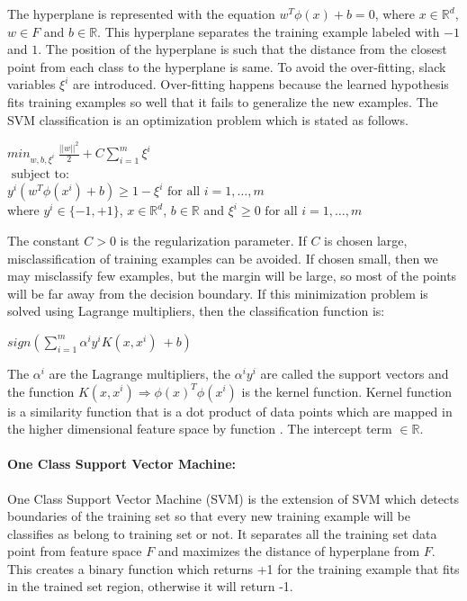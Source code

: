 \documentclass[12pt,oneside,a4paper]{article}
\begin{document}
The hyperplane is represented with the equation $w^{T} \phi(x) + b = 0$, where $x \in \mathbb{R}^d$, $w \in F$ and $b \in \mathbb{R}$. This hyperplane separates the training example labeled with $-1$ and $1$. The position of the hyperplane is such that the distance from the closest point from each class to the hyperplane is same. To avoid the over-fitting, slack variables $\xi^{i}$ are introduced. Over-fitting happens because the learned hypothesis fits training examples so well that it fails to generalize the new examples. The SVM classification is an optimization problem which is stated as follows.\cite{svm} \cite{svm-ml}

\begin{center}
  ${min}_{w,b,\xi^i} \ \frac{||w||^2}{2} + C \sum_{i=1}^m \xi^i$ \\
  $\mbox{ subject to: }$ \\
  $y^i( w^T \phi(x^i) + b) \geq 1 - \xi^i \mbox{ for all } i = 1, \dots, m$ \\
  where $y^{i} \in \{-1, +1\}$, $x \in \mathbb{R}^d$, $b \in \mathbb{R}$ and $\xi^i \geq 0 \mbox{ for all } i = 1, \dots, m$ \\
\end{center}

 The constant $C > 0$ is the regularization parameter. If $C$ is chosen large, misclassification of training examples can be avoided. If chosen small, then we may misclassify few examples, but the margin will be large, so most of the points will be far away from the decision boundary. If this minimization problem is solved using Lagrange multipliers, then the classification function is:

\begin{center}
$sign(\sum_{i=1}^m \alpha^i y^i K(x,x^i) \ + b)$
\end{center}

The $\alpha^i$ are the Lagrange multipliers, the $\alpha^i y^i$ are called the support vectors and the function $K(x,x^i) \Rightarrow \phi(x)^T \phi(x^i)$ is the kernel function. Kernel function is a similarity function that is a dot product of data points which are mapped in the higher dimensional feature space by function \Phi. The intercept term $ \in \mathbb{R}$.

\paragraph{One Class Support Vector Machine:}

One Class Support Vector Machine (SVM) is the extension of SVM which detects boundaries of the training set so that every new training example will be classifies as belong to training set or not. It separates all the training set data point from feature space $F$ and maximizes the distance of hyperplane from $F$. This creates a binary function which returns +1 for the training example that fits in the trained set region, otherwise it will return -1.
\end{document}
